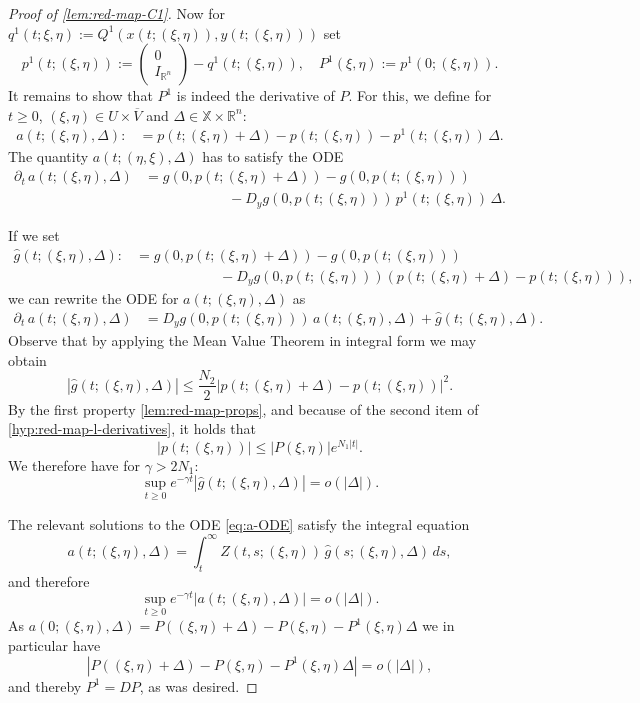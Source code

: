\documentclass[10pt,a4paper]{amsart}
\newcommand{\RSet}{\mathbb{R}}
\newcommand{\XSet}{\mathbb{X}}
\begin{document}
\begin{proof}[Proof of \cref{lem:red-map-C1}]
Now for $q^1(t;\xi,\eta) := Q^1(x(t;(\xi,\eta)),y(t;(\xi,\eta)))$ set
\[
p^1(t;(\xi,\eta)) := \begin{pmatrix} 0 \\ I_{\RSet^n} \end{pmatrix} - q^1(t;(\xi,\eta)), \quad P^1(\xi,\eta) := p^1(0;(\xi,\eta)).
\]
It remains to show that $P^1$ is indeed the derivative of $P$. For this, we define for $t \geq 0$, $(\xi,\eta) \in U \times \overline{V}$ and $\Delta \in \XSet \times \RSet^n$:
\begin{align*}
a(t; (\xi,\eta), \Delta) :&= p(t; (\xi,\eta) + \Delta) - p(t; (\xi,\eta)) - p^1(t; (\xi,\eta)) \, \Delta.
\end{align*}
The quantity $a(t; (\eta,\xi), \Delta)$ has to satisfy the ODE
\begin{equation*}
\begin{aligned}
\partial_t \, a(t; (\xi,\eta), \Delta) &= g(0,p(t;(\xi,\eta)+\Delta)) - g(0,p(t;(\xi,\eta))) \\
&\qquad \qquad \qquad - D_y g(0,p(t;(\xi,\eta))) \, p^1(t;(\xi,\eta)) \, \Delta.
\end{aligned}
\end{equation*}

If we set
\begin{align*}
\hat{g}(t; (\xi,\eta), \Delta) :&= g(0,p(t;(\xi,\eta)+\Delta)) - g(0,p(t;(\xi,\eta))) \\
&\qquad \qquad \qquad - D_y g(0,p(t;(\xi,\eta))) \left( p(t;(\xi,\eta)+\Delta) - p(t;(\xi,\eta))  \right),
\end{align*}
we can rewrite the ODE for $a(t; (\xi,\eta), \Delta)$ as
\begin{equation}\label{eq:a-ODE}
\begin{aligned}
\partial_t \, a(t; (\xi,\eta), \Delta) &= D_y g(0,p(t;(\xi,\eta))) \, a(t; (\xi,\eta), \Delta) + \hat{g}(t; (\xi,\eta), \Delta) .
\end{aligned}
\end{equation}
Observe that by applying the Mean Value Theorem in integral form we may obtain
\[
| \hat{g}(t; (\xi,\eta), \Delta) | \leq \frac{N_2}{2} \left| p(t;(\xi,\eta)+\Delta) - p(t;(\xi,\eta))  \right|^2.
\]
By the first property \cref{lem:red-map-props}, and because of the second item of \cref{hyp:red-map-l-derivatives}, it holds that
\[
| p(t;(\xi,\eta)) | \leq | P(\xi,\eta) | e^{N_1|t|}.
\]
We therefore have for $\gamma > 2N_1$:
\[
\sup_{t \geq 0} e^{-\gamma t} | \hat{g}(t; (\xi,\eta), \Delta) | = o(|\Delta|).
\]

The relevant solutions to the ODE \cref{eq:a-ODE} satisfy the integral equation
\[
 a(t; (\xi,\eta), \Delta) =   \int_t^{\infty} Z(t,s; (\xi,\eta)) \, \hat{g}(s; (\xi,\eta), \Delta) \, ds,
\]
and therefore
\[
\sup_{t \geq 0} e^{-\gamma t} |  a(t; (\xi,\eta), \Delta)  | = o(|\Delta|).
\]
As $a(0; (\xi,\eta), \Delta) = P((\xi,\eta)+\Delta) - P(\xi,\eta) - P^1(\xi,\eta) \Delta$ we in particular have
\[
\left| P((\xi,\eta)+\Delta) - P(\xi,\eta) - P^1(\xi,\eta) \Delta \right| =   o(|\Delta|),
\]
and thereby $P^1 = DP$, as was desired. 
\end{proof}
\end{document}
